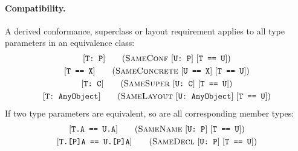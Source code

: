 \documentclass[../generics]{subfiles}
\begin{document}
\paragraph{Compatibility.}
A derived conformance, superclass or layout requirement applies to all type parameters in an equivalence class:
\begin{gather*}
\SameConfStepDef\\
\SameConcreteStepDef\\
\SameSuperStepDef\\
\SameLayoutStepDef
\end{gather*}
If two type parameters are equivalent, so are all corresponding member types:
\begin{gather*}
\SameNameStepDef\\
\SameDeclStepDef
\end{gather*}
\end{document}
